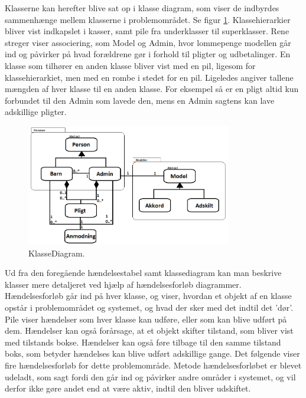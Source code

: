 Klasserne kan herefter blive sat op i klasse diagram, som viser de indbyrdes sammenhænge mellem klasserne i problemområdet. Se figur \ref{KlasseDiagram}. Klassehierarkier bliver vist indkapslet i kasser, samt pile fra underklasser til superklasser. Rene streger viser associering, som Model og Admin, hvor lommepenge modellen går ind og påvirker på hvad forældrene gør i forhold til pligter og udbetalinger. En klasse som tilhører en anden klasse bliver vist med en pil, ligesom for klassehierarkiet, men med en rombe i stedet for en pil. Ligeledes angiver tallene mængden af hver klasse til en anden klasse. For eksempel så er en pligt altid kun forbundet til den Admin som lavede den, mens en Admin sagtens kan lave adskillige pligter.

\begin{figure}[H]
\centering
\includegraphics[width=0.8\textwidth]{Billeder/KlasseDiagram.png}
\caption{KlasseDiagram.}
\label{KlasseDiagram}
\end{figure}

Ud fra den foregående hændelsestabel samt klassediagram kan man beskrive klasser mere detaljeret ved hjælp af hændelsesforløb diagrammer. Hændelsesforløb går ind på hver klasse, og viser, hvordan et objekt af en klasse opstår i problemområdet og systemet, og hvad der sker med det indtil det ’dør’. Pile viser hændelser som hver klasse kan udføre, eller som kan blive udført på dem. Hændelser kan også forårsage, at et objekt skifter tilstand, som bliver vist med tilstands bokse. Hændelser kan også føre tilbage til den samme tilstand boks, som betyder hændelses kan blive udført adskillige gange. Det følgende viser fire hændelsesforløb for dette problemområde. Metode hændelsesforløbet er blevet udeladt, som sagt fordi den går ind og påvirker andre områder i systemet, og vil derfor ikke gøre andet end at være aktiv, indtil den bliver udskiftet.

